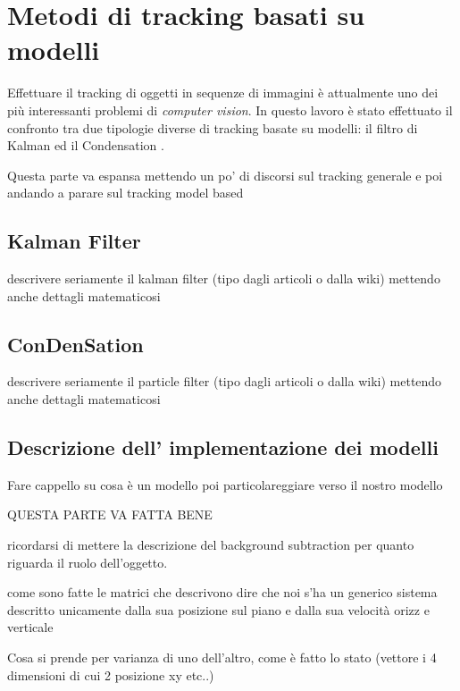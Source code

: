 \section{Metodi di tracking basati su modelli}
Effettuare il tracking di oggetti in sequenze di immagini è attualmente uno dei più interessanti problemi di \textit{computer vision}. In questo lavoro è stato effettuato il confronto tra due tipologie diverse di tracking basate su modelli: il filtro di Kalman \cite{kalman-intro} ed il Condensation \cite{condensation}.

Questa parte va espansa mettendo un po' di discorsi sul tracking generale e poi andando a parare sul tracking model based

\subsection{Kalman Filter}
descrivere seriamente il kalman filter (tipo dagli articoli o dalla wiki) mettendo anche dettagli matematicosi

\subsection{ConDenSation}
descrivere seriamente il particle filter (tipo dagli articoli o dalla wiki) mettendo anche dettagli matematicosi

\subsection{Descrizione dell' implementazione dei modelli}
Fare cappello su cosa è un modello poi particolareggiare verso il nostro modello

QUESTA PARTE VA FATTA BENE

ricordarsi di mettere la descrizione del background subtraction per quanto riguarda il ruolo dell'oggetto.

come sono fatte le matrici che descrivono 
dire che noi s'ha un generico sistema descritto unicamente dalla sua posizione sul piano e dalla sua velocità orizz e verticale

Cosa si prende per varianza di uno dell'altro, come è fatto lo stato (vettore i 4 dimensioni di cui 2 posizione xy etc..)

